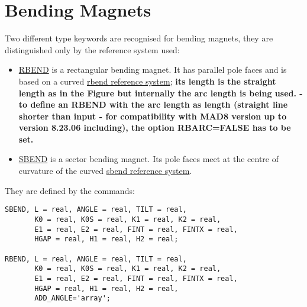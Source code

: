 
\section{Bending Magnets}
\label{sec:bend}

Two different type keywords are recognised for bending magnets, they are
distinguished only by the reference system used:  
\begin{itemize}
   \item \href{rbend}{RBEND} \label{bend_rbend} is a rectangular bending magnet. It has
     parallel pole faces and is based on a curved
     \href{local_system.html#rbend}{rbend reference system};  \textbf{
       its length is the straight length as in the Figure but internally
       the arc length is being used.  - to define an RBEND with the arc
       length as length (straight line shorter than input - for
       compatibility with MAD8 version up to version 8.23.06 including),
       the option RBARC=FALSE has to be set.} 
   \item \href{sbend}{SBEND} is a sector bending magnet. Its pole faces
     meet at the centre of curvature of the curved
     \href{local_system.html#sbend}{sbend reference system}.  
\end{itemize} 

They are defined by the commands: 
\begin{verbatim}
SBEND, L = real, ANGLE = real, TILT = real, 
       K0 = real, K0S = real, K1 = real, K2 = real, 
       E1 = real, E2 = real, FINT = real, FINTX = real, 
       HGAP = real, H1 = real, H2 = real;

RBEND, L = real, ANGLE = real, TILT = real, 
       K0 = real, K0S = real, K1 = real, K2 = real, 
       E1 = real, E2 = real, FINT = real, FINTX = real,
       HGAP = real, H1 = real, H2 = real,
       ADD_ANGLE='array';
\end{verbatim} 

